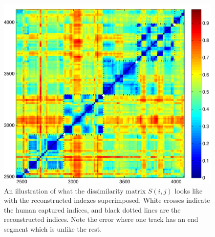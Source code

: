 \documentclass[twocolumn]{article}
\begin{document}
\begin{figure}[t]
\centering
\includegraphics[width=\textwidth]{images/simmat_preds}

\caption{An illustration of what the dissimilarity matrix $S(i,j)$ looks like with the reconstructed indexes superimposed. White crosses indicate the human captured indices, and black dotted lines are the reconstructed indices. Note the error where one track has an end segment which is unlike the rest. }
\label{fig:predictions}
\end{figure} 


 
\end{document}
